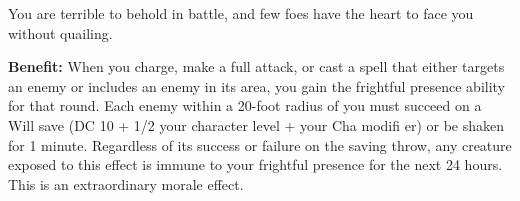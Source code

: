 
You are terrible to behold in battle, and few foes have the heart to face you without quailing.

\textbf{Benefit:} When you charge, make a full attack, or cast a spell that either targets an enemy or includes an enemy in its area, you gain the frightful presence ability for that round. Each enemy within a 20-foot radius of you must succeed on a Will save (DC 10 + 1/2 your character level + your Cha modifi er) or be shaken for 1 minute. Regardless of its success or failure on the saving throw, any creature exposed to this effect is immune to your frightful presence for the next 24 hours. This is an extraordinary morale effect.